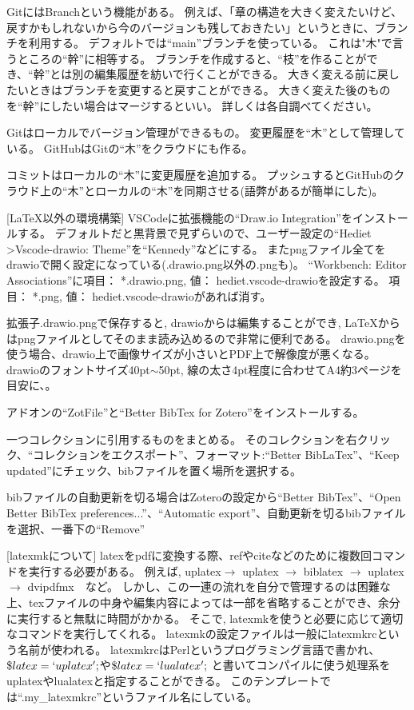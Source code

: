 \documentclass[uplatex, a4paper, dvipdfmx, 12pt]{jsreport}
\begin{document}
		GitにはBranchという機能がある。
		例えば、「章の構造を大きく変えたいけど、戻すかもしれないから今のバージョンも残しておきたい」というときに、ブランチを利用する。
		デフォルトでは``main''ブランチを使っている。
		これは"木"で言うところの``幹''に相等する。
		ブランチを作成すると、``枝''を作ることができ、``幹''とは別の編集履歴を紡いで行くことができる。
		大きく変える前に戻したいときはブランチを変更すると戻すことができる。
		大きく変えた後のものを``幹''にしたい場合はマージするといい。
		詳しくは各自調べてください。

		Gitはローカルでバージョン管理ができるもの。
		変更履歴を``木''として管理している。
		GitHubはGitの``木''をクラウドにも作る。

		コミットはローカルの``木''に変更履歴を追加する。
		プッシュするとGitHubのクラウド上の``木''とローカルの``木''を同期させる(語弊があるが簡単にした)。

[LaTeX以外の環境構築]
		VSCodeに拡張機能の``Draw.io Integration''をインストールする。
		デフォルトだと黒背景で見ずらいので、ユーザー設定の``Hediet \textgreater Vscode-drawio: Theme''を``Kennedy''などにする。
		またpngファイル全てをdrawioで開く設定になっている(.drawio.png以外の.pngも)。
		``Workbench: Editor Associations''に項目： *.drawio.png, 値： hediet.vscode-drawioを設定する。
		項目： *.png, 値： hediet.vscode-drawioがあれば消す。

		拡張子.drawio.pngで保存すると, drawioからは編集することができ, \LaTeX からはpngファイルとしてそのまま読み込めるので非常に便利である。
		drawio.pngを使う場合、drawio上で画像サイズが小さいとPDF上で解像度が悪くなる。
		drawioのフォントサイズ40pt$\sim$50pt, 線の太さ4pt程度に合わせてA4約3ページを目安に、。

		アドオンの``ZotFile''と``Better BibTex for Zotero''をインストールする。

			一つコレクションに引用するものをまとめる。
			そのコレクションを右クリック、``コレクションをエクスポート''、フォーマット:``Better BibLaTex''、``Keep updated''にチェック、bibファイルを置く場所を選択する。

			bibファイルの自動更新を切る場合はZoteroの設定から``Better BibTex''、``Open Better BibTex preferences...''、``Automatic export''、自動更新を切るbibファイルを選択、一番下の``Remove''


[latexmkについて]
	latexをpdfに変換する際、refやciteなどのために複数回コマンドを実行する必要がある。
	例えば, uplatex$\rightarrow$ uplatex $\rightarrow$ biblatex $\rightarrow$ uplatex $\rightarrow$ dvipdfmx　など。
	しかし、この一連の流れを自分で管理するのは困難な上、texファイルの中身や編集内容によっては一部を省略することができ、余分に実行すると無駄に時間がかかる。
	そこで, latexmkを使うと必要に応じて適切なコマンドを実行してくれる。
	latexmkの設定ファイルは一般にlatexmkrcという名前が使われる。
	latexmkrcはPerlというプログラミング言語で書かれ、
	$\$latex = `uplatex';$や$\$latex =`lualatex';$
	と書いてコンパイルに使う処理系をuplatexやlualatexと指定することができる。
	このテンプレートでは``.my\_latexmkrc''というファイル名にしている。
\end{document}
